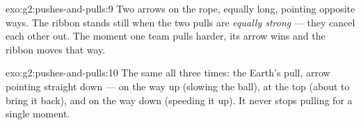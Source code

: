 \begin{solution}{exo:g2:pushes-and-pulls:9}
Two arrows on the rope, equally long, pointing opposite ways. The
ribbon stands still when the two pulls are \emph{equally strong} ---
they cancel each other out. The moment one team pulls harder, its
arrow wins and the ribbon moves that way.
\end{solution}

\begin{solution}{exo:g2:pushes-and-pulls:10}
The same  all three times: the Earth's pull, arrow pointing
straight down --- on the way up (slowing the ball), at the top
(about to bring it back), and on the way down (speeding it up). It
never stops pulling for a single moment.
\end{solution}
